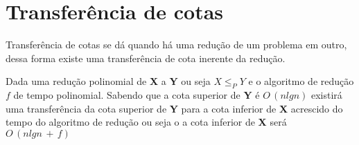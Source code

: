 \section{Transferência de cotas}
Transferência de cotas se dá quando há uma redução de um problema em outro, dessa forma existe uma transferência de cota inerente da redução.

Dada uma redução polinomial de \textbf{X} a \textbf{Y} ou seja $X \leq_P Y$ e o algoritmo de redução $f$ de tempo polinomial. Sabendo que a cota superior de \textbf{Y} é $O\,(nlgn)$ existirá uma transferência da cota superior de \textbf{Y} para a cota inferior de \textbf{X} acrescido do tempo do algoritmo de redução ou seja o a cota inferior de \textbf{X} será $O\,(nlgn\,+\,f)$

